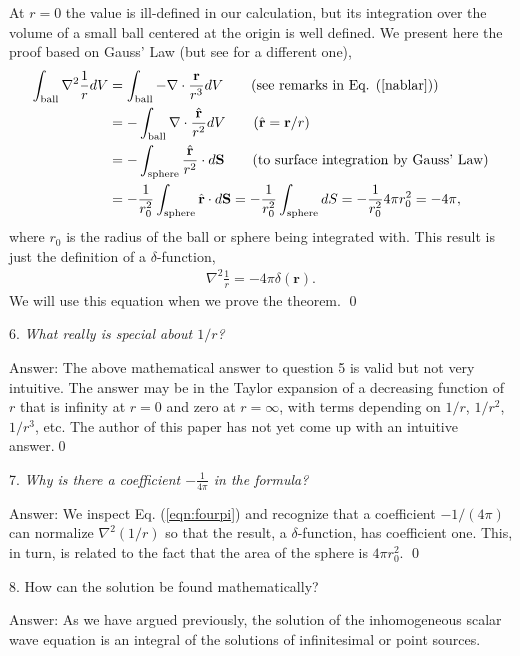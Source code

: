 \documentclass[11pt]{article}              %
\begin{document}
At $r=0$ the value is ill-defined in our calculation, but its integration over the volume of a small ball centered at the origin is well defined. We present here the proof based on Gauss' Law (but see \cite{melia2001electrodynamics} for a different one),
\begin{align}
\int_{\text{ball}}\nabla^2\frac{1}{r}dV&=\int_{\text{ball}}-\nabla\cdot\frac{\mathbf r}{r^3}dV\tag{see remarks in Eq. (\ref{nablar})}\\
&=-\int_{\text{ball}}\nabla\cdot\frac{\hat{\mathbf r}}{r^2}dV\tag{$\hat{\mathbf r}={\mathbf r}/r$}\\
&=-\int_{\text{sphere}}\frac{\hat{\mathbf r}}{r^2}\cdot d{\mathbf S}\tag{to surface integration by Gauss' Law}\\
&=-\frac{1}{r_0^2}\int_{\text{sphere}}\hat{\mathbf r}\cdot d{\mathbf S}=-\frac{1}{r_0^2}\int_{\text{sphere}}dS=-\frac{1}{r_0^2}4\pi r_0^2=-4\pi,\notag
\end{align}
where $r_0$ is the radius of the ball or sphere being integrated with. This result is just the definition of a $\delta$-function,
\begin{align}
	\nabla^2\frac{1}{r}=-4\pi\delta({\mathbf r}).\label{eqn:fourpi}
\end{align}
We will use this equation when we prove the theorem. \qed

6. {\it What really is special about $1/r$?}

Answer: The above mathematical answer to question 5 is valid but not very intuitive. The answer may be in the Taylor expansion of a decreasing function of $r$ that is infinity at $r=0$ and zero at $r=\infty$, with terms depending on $1/r$, $1/r^2$, $1/r^3$, etc. The author of this paper has not yet come up with an intuitive answer.\qed

7. {\it Why is there a coefficient $-\frac{1}{4\pi}$ in the formula?} 

Answer: We inspect Eq. (\ref{eqn:fourpi}) and recognize that a coefficient $-1/(4\pi)$ can normalize $\nabla^2(1/r)$ so that the result, a $\delta$-function, has coefficient one. This, in turn, is related to the fact that the area of the sphere is $4\pi r_0^2$. \qed

8. How can the solution be found mathematically?

Answer: As we have argued previously, the solution of the inhomogeneous scalar wave equation is an integral of the solutions of infinitesimal or point sources. 
\end{document}
